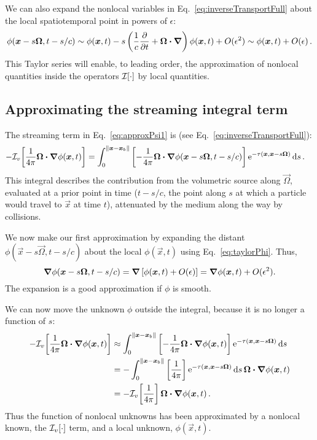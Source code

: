 We can also expand the nonlocal variables in Eq.~\eqref{eq:inverseTransportFull}
about the local spatiotemporal point in powers of $\epsilon$:
\begin{equation} \label{eq:taylorPhi}
  \phi(\bm{x} - s \bm{\Omega}, t-s/c)
  \sim \phi(\bm{x},t) - s \left( \frac{1}{c} \frac{\partial }{\partial t} + \bm{\Omega} \bm{\cdot}
  \bm{\nabla}  \right) \phi (\bm{x}, t) + O(\epsilon^2) \sim \phi(\bm{x},t) +
  O(\epsilon) \,.
\end{equation}
This Taylor series will enable, to leading order, the approximation of nonlocal
quantities inside the operators $\mathcal{I}_{}\!\left[\cdot\right]$ by local quantities.

\subsection{Approximating the streaming integral term}\label{sec:adStreaming}
The streaming term in Eq.~\eqref{eq:approxPsi1} is (see
Eq.~\eqref{eq:inverseTransportFull}):
\begin{align*}
- \mathcal{I}_{v}\!\left[\frac{1}{4\pi} \bm{\Omega}\bm{\cdot} \bm{\nabla} \phi(\bm{x}, t)\right]
  &= \int_{0}^{\left\| \bm{x} - \bm{x}_b \right\|}
    \left[ -\frac1{4\pi}\bm{\Omega}\bm{\cdot} \bm{\nabla} \phi(\bm{x} - s \bm{\Omega},
    t-s/c)
    \right]
    \mathop{}\!\mathrm{e}^{ -\tau(\bm{x}, \bm{x} - s \bm{\Omega})}
    \mathop{}\!\mathrm{d} s\,.
\end{align*}
This integral describes the contribution from the volumetric source  along
$\vec{\Omega}$, evaluated at a prior
point in time ($t-s/c$, the point along $s$ at which a particle would travel
to $\vec{x}$ at time $t$), attenuated by the medium along the way by collisions.

We now make our first approximation by expanding the distant $\phi(\vec{x} - s
\vec{\Omega}, t-s/c)$ about the local $\phi(\vec{x}, t)$ using
Eq.~\eqref{eq:taylorPhi}. Thus,
\begin{equation*}
  \bm{\nabla} \phi(\bm{x} - s \bm{\Omega}, t-s/c)
  = \bm{\nabla} \left[ \phi(\bm{x}, t) + O(\epsilon) \right]
  = \bm{\nabla} \phi(\bm{x}, t) + O(\epsilon^2).
\end{equation*}
The expansion is a good approximation if $\phi$ is smooth.

We can now move the unknown $\phi$ outside the integral,
because it is no longer a function of $s$:
\begin{align}\nonumber
- \mathcal{I}_{v}\!\left[\frac{1}{4\pi} \bm{\Omega}\bm{\cdot} \bm{\nabla} \phi(\bm{x}, t)\right]
  &\approx \int_{0}^{\left\| \bm{x} - \bm{x}_b \right\|}
    \left[ -\frac1{4\pi}\bm{\Omega}\bm{\cdot} \bm{\nabla} \phi(\bm{x},t) \right]
    \mathop{}\!\mathrm{e}^{ -\tau(\bm{x}, \bm{x} - s \bm{\Omega})}
    \mathop{}\!\mathrm{d} s
  \\\nonumber
  &= - \int_{0}^{\left\| \bm{x} - \bm{x}_b \right\|}
    \left[ \frac1{4\pi}\right]
    \mathop{}\!\mathrm{e}^{ -\tau(\bm{x}, \bm{x} - s \bm{\Omega})} \mathop{}\!\mathrm{d} s \,
    \bm{\Omega}\bm{\cdot} \bm{\nabla} \phi(\bm{x},t)
  \\\label{eq:streamingApprox}
  &= - \mathcal{I}_{v}\!\left[ \frac1{4\pi} \right] \bm{\Omega}\bm{\cdot} \bm{\nabla} \phi(\bm{x},t)
  \,.
\end{align}
Thus the function of nonlocal unknowns has been approximated by a nonlocal known, the
$\mathcal{I}_{v}\!\left[\cdot\right]$ term, and a local unknown, $\phi(\vec{x},t)$.

